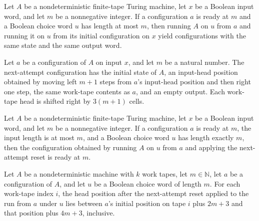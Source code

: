 \begin{theorem}
\label{Turing.ClockHost.ReadyAt.runWith_eq}
\leanok
{}
Let $A$ be a nondeterministic finite-tape Turing machine, let $x$ be a Boolean input
word, and let $m$ be a nonnegative integer. If a configuration $a$ is ready at $m$ and a
Boolean choice word $u$ has length at most $m$, then running $A$ on $u$ from $a$ and
running it on $u$ from its initial configuration on $x$ yield configurations with the
same state and the same output word.
\end{theorem}

\begin{definition}
\label{Turing.ClockHost.nextAttempt}
\leanok
{}
Let $a$ be a configuration of $A$ on input $x$, and let $m$ be a natural number. The
next-attempt configuration has the initial state of $A$, an input-head position obtained
by moving left $m+1$ steps from $a$'s input-head position and then right one step, the
same work-tape contents as $a$, and an empty output. Each work-tape head is shifted
right by $3(m+1)$ cells.
\end{definition}

\begin{theorem}
\label{Turing.ClockHost.ReadyAt.next}
\leanok
{}
Let $A$ be a nondeterministic finite-tape Turing machine, let $x$ be a Boolean input
word, and let $m$ be a nonnegative integer. If a configuration $a$ is ready at $m$, the
input length is at most $m$, and a Boolean choice word $u$ has length exactly $m$, then
the configuration obtained by running $A$ on $u$ from $a$ and applying the next-attempt
reset is ready at $m$.
\end{theorem}

\begin{theorem}
\label{Turing.ClockHost.nextAttempt_workTapePos}
\leanok
{}
Let $A$ be a nondeterministic machine with $k$ work tapes, let $m\in\mathbb N$, let $a$
be a configuration of $A$, and let $u$ be a Boolean choice word of length $m$. For each
work-tape index $i$, the head position after the next-attempt reset applied to the run
from $a$ under $u$ lies between $a$’s initial position on tape $i$ plus $2m+3$ and that
position plus $4m+3$, inclusive.
\end{theorem}

